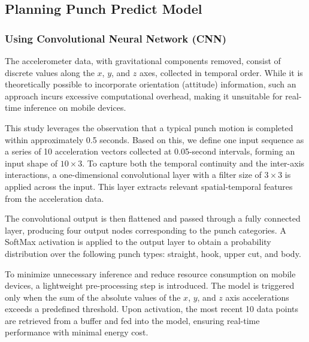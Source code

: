 \documentclass{article}
\begin{document}
\subsection{Planning Punch Predict Model}

\subsubsection{Using Convolutional Neural Network (CNN)}

The accelerometer data, with gravitational components removed, consist of discrete values along the $x$, $y$, and $z$ axes, collected in temporal order. While it is theoretically possible to incorporate orientation (attitude) information, such an approach incurs excessive computational overhead, making it unsuitable for real-time inference on mobile devices.

This study leverages the observation that a typical punch motion is completed within approximately 0.5 seconds. Based on this, we define one input sequence as a series of 10 acceleration vectors collected at 0.05-second intervals, forming an input shape of $10 \times 3$. To capture both the temporal continuity and the inter-axis interactions, a one-dimensional convolutional layer with a filter size of $3 \times 3$ is applied across the input. This layer extracts relevant spatial-temporal features from the acceleration data.

The convolutional output is then flattened and passed through a fully connected layer, producing four output nodes corresponding to the punch categories. A SoftMax activation is applied to the output layer to obtain a probability distribution over the following punch types: straight, hook, upper cut, and body.

To minimize unnecessary inference and reduce resource consumption on mobile devices, a lightweight pre-processing step is introduced. The model is triggered only when the sum of the absolute values of the $x$, $y$, and $z$ axis accelerations exceeds a predefined threshold. Upon activation, the most recent 10 data points are retrieved from a buffer and fed into the model, ensuring real-time performance with minimal energy cost.
\end{document}

